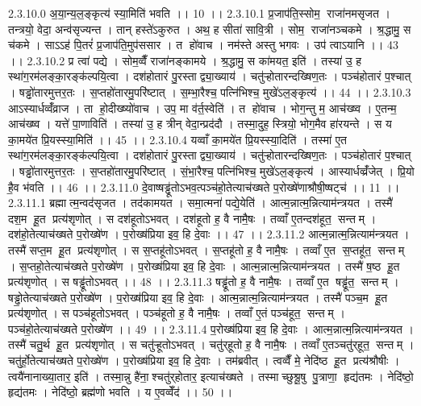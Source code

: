 2.3.10.0
अ॒या॒न्य॒ल॒ङ्कृत्य॑ स्या॒मिति॑ भवति ।। 10 ।।
2.3.10.1
प्र॒जाप॑ति॒स्सोम॒॒ राजा॑नमसृजत । तन्त्रयो॒ वेदा॒ अन्व॑सृज्यन्त । तान् हस्ते॑ऽकुरुत । अथ॒ ह सीता॑ सावि॒त्री । सोम॒॒ राजा॑नञ्चकमे । श्र॒द्धामु॒ स च॑कमे । साऽऽह॑ पि॒तरं॑ प्र॒जाप॑ति॒मुप॑ससार । त हो॑वाच । नम॑स्ते अस्तु भगवः । उप॑ त्वाऽयानि ।। 43 ।।
2.3.10.2
प्र त्वा॑ पद्ये । सोम॒व्वैँ राजा॑नङ्कामये । श्र॒द्धामु॒ स का॑मयत॒ इति॑ । तस्या॑ उ॒ ह स्था॑ग॒रम॑लङ्का॒रङ्क॑ल्पयि॒त्वा । दश॑होतारं पु॒रस्ताद्व्या॒ख्याय॑ । चतु॑ऱ्होतारन्दख्षिण॒तः । पञ्च॑होतारं प॒श्चात् । षड्ढो॑तारमुत्तर॒तः । स॒प्तहो॑तारमु॒परि॑ष्टात् । स॒म्भा॒रैश्च॒ पत्नि॑भिश्च॒ मुखे॑ऽल॒ङ्कृत्य॑ ।। 44 ।।
2.3.10.3
आऽस्यार्धव्वँ॑व्राज । ता हो॒दीख्ष्यो॑वाच । उप॒ मा व॑र्त॒स्वेति॑ । त हो॑वाच । भोग॒न्तु म॒ आच॑ख्ष्व । ए॒तन्म॒ आच॑ख्ष्व । यत्ते॑ पा॒णाविति॑ । तस्या॑ उ॒ ह त्रीन् वेदा॒न्प्रद॑दौ । तस्मा॒दुह॒ स्त्रियो॒ भोग॒मैव हा॑रयन्ते । स य का॒मये॑त प्रि॒यस्स्या॒मिति॑ ।। 45 ।।
2.3.10.4
यव्वाँ का॒मये॑त प्रि॒यस्स्या॒दिति॑ । तस्मा॑ ए॒त स्था॑ग॒रम॑लङ्का॒रङ्क॑ल्पयि॒त्वा । दश॑होतारं पु॒रस्ताद्व्या॒ख्याय॑ । चतु॑ऱ्होतारन्दख्षिण॒तः । पञ्च॑होतारं प॒श्चात् । षड्ढो॑तारमुत्तर॒तः । स॒प्तहो॑तारमु॒परि॑ष्टात् । सं॒भा॒रैश्च॒ पत्नि॑भिश्च॒ मुखे॑ऽल॒ङ्कृत्य॑ । आस्यार्धव्व्रँ॑जेत् । प्रि॒यो है॒व भ॑वति ।। 46 ।।
2.3.11.0
दे॒वाष्षड्ढू॑तोऽभव॒त्पञ्च॑हो॒तेत्याच॑ख्षते प॒रोख्षे॑णाश्रौषी॒ष्षट्च॑ ।। 11 ।।
2.3.11.1
ब्रह्मात्म॒न्वद॑सृजत । तद॑कामयत । समा॒त्मना॑ पद्ये॒येति॑ । आत्म॒न्नात्म॒न्नित्याम॑न्त्रयत । तस्मै॑ दश॒म हू॒त प्रत्य॑शृणोत् । स दश॑हूतोऽभवत् । दश॑हूतो ह॒ वै नामै॒षः । तव्वाँ ए॒तन्दश॑हूत॒॒ सन्तम् । दश॑हो॒तेत्याच॑ख्षते प॒रोख्षे॑ण । प॒रोख्ष॑प्रिया इव॒ हि दे॒वाः ।। 47 ।।
2.3.11.2
आत्म॒न्नात्म॒न्नित्याम॑न्त्रयत । तस्मै॑ सप्त॒म हू॒त प्रत्य॑शृणोत् । स स॒प्तहू॑तोऽभवत् । स॒प्तहू॑तो ह॒ वै नामै॒षः । तव्वाँ ए॒त स॒प्तहू॑त॒॒ सन्तम् । स॒प्तहो॒तेत्याच॑ख्षते प॒रोख्षे॑ण । प॒रोख्ष॑प्रिया इव॒ हि दे॒वाः । आत्म॒न्नात्म॒न्नित्याम॑न्त्रयत । तस्मै॑ ष॒ष्ठ हू॒त प्रत्य॑शृणोत् । स षड्ढू॑तोऽभवत् ।। 48 ।।
2.3.11.3
षड्ढू॑तो ह॒ वै नामै॒षः । तव्वाँ ए॒त षड्ढू॑त॒॒ सन्तम् । षड्ढो॒तेत्याच॑ख्षते प॒रोख्षे॑ण । प॒रोख्ष॑प्रिया इव॒ हि दे॒वाः । आत्म॒न्नात्म॒न्नित्याम॑न्त्रयत । तस्मै॑ पञ्च॒म हू॒त प्रत्य॑शृणोत् । स पञ्च॑हूतोऽभवत् । पञ्च॑हूतो ह॒ वै नामै॒षः । तव्वाँ ए॒तं पञ्च॑हूत॒॒ सन्तम् । पञ्च॑हो॒तेत्याच॑ख्षते प॒रोख्षे॑ण ।। 49 ।।
2.3.11.4
प॒रोख्ष॑प्रिया इव॒ हि दे॒वाः । आत्म॒न्नात्म॒न्नित्याम॑न्त्रयत । तस्मै॑ चतु॒र्थ हू॒त प्रत्य॑शृणोत् । स चतु॑ऱ्हूतोऽभवत् । चतु॑र्‌हूतो ह॒ वै नामै॒षः । तव्वाँ ए॒तञ्चतु॑र्‌हूत॒॒ सन्तम् । चतु॑र्हो॒तेत्याच॑ख्षते प॒रोख्षे॑ण । प॒रोख्ष॑प्रिया इव॒ हि दे॒वाः । तम॑ब्रवीत् । त्वव्वैँ मे॒ नेदि॑ष्ठ हू॒त प्रत्य॑श्रौषीः । त्वयै॑नानाख्या॒तार॒ इति॑ । तस्मा॒न्नु है॑ना॒॒श्चतु॑र्‌होतार॒ इत्याच॑ख्षते । तस्माच्छुश्रू॒षु पु॒त्राणा॒॒ हृद्य॑तमः । नेदि॑ष्ठो॒ हृद्य॑तमः । नेदि॑ष्ठो॒ ब्रह्म॑णो भवति । य ए॒वव्वेँद॑ ।। 50 ।।
